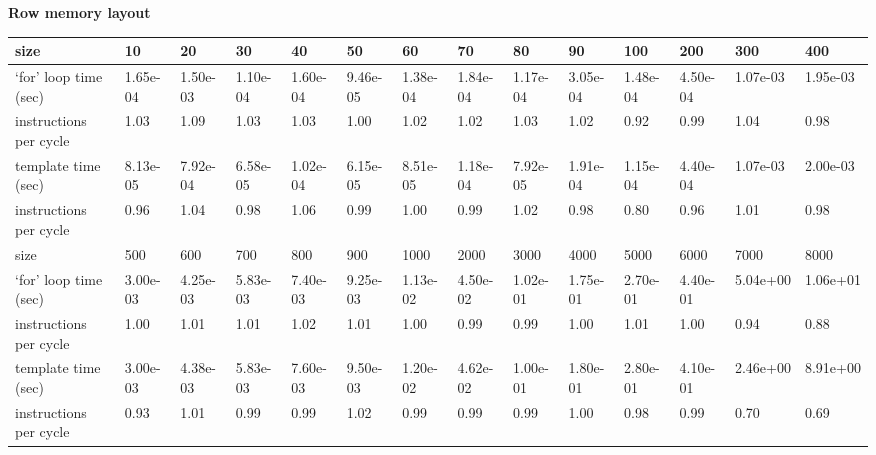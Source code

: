 \documentclass[a4paper,11pt]{article}
\begin{document}
\bf
Row memory layout\\
\rm



\begin{tabular}{|l|l|l|l|l|l|l|l|l|l|l|l|l|l|}
\hline
size & 10 & 20 & 30 & 40 & 50 & 60 & 70 & 80 & 90 & 100 & 200 & 300 & 400 \\
\hline
`for' loop time (sec) & 1.65e-04 & 1.50e-03 & 1.10e-04 & 1.60e-04 & 9.46e-05 & 1.38e-04 & 1.84e-04 & 1.17e-04 & 3.05e-04 & 1.48e-04 & 4.50e-04 & 1.07e-03 & 1.95e-03\\
instructions per cycle & 1.03 & 1.09 & 1.03 & 1.03 & 1.00 & 1.02 & 1.02 & 1.03 & 1.02 & 0.92 & 0.99 & 1.04 & 0.98 \\
\hline
template time (sec) & 8.13e-05 & 7.92e-04 & 6.58e-05 & 1.02e-04 & 6.15e-05 & 8.51e-05 & 1.18e-04 & 7.92e-05 & 1.91e-04 & 1.15e-04 & 4.40e-04 & 1.07e-03 & 2.00e-03 \\
instructions per cycle & 0.96 & 1.04 & 0.98 & 1.06 & 0.99 & 1.00 & 0.99 & 1.02 & 0.98 & 0.80 & 0.96 & 1.01 & 0.98 \\
\hline
\hline
size & 500 & 600 & 700 & 800 & 900 & 1000 & 2000 & 3000 & 4000 & 5000 & 6000 & 7000 & 8000\\
\hline
`for' loop time (sec) & 3.00e-03 & 4.25e-03 & 5.83e-03 & 7.40e-03 & 9.25e-03 & 1.13e-02 & 4.50e-02 & 1.02e-01 & 1.75e-01 & 2.70e-01 & 4.40e-01 & 5.04e+00 & 1.06e+01 \\
instructions per cycle & 1.00 & 1.01 & 1.01 & 1.02 & 1.01 & 1.00 & 0.99 & 0.99 & 1.00 & 1.01 & 1.00 & 0.94 & 0.88\\
\hline
template time (sec) & 3.00e-03 & 4.38e-03 & 5.83e-03 & 7.60e-03 & 9.50e-03 & 1.20e-02 & 4.62e-02 & 1.00e-01 & 1.80e-01 & 2.80e-01 & 4.10e-01 & 2.46e+00 & 8.91e+00\\
instructions per cycle & 0.93 & 1.01 & 0.99 & 0.99 & 1.02 & 0.99 & 0.99 & 0.99 & 1.00 & 0.98 & 0.99 & 0.70 & 0.69\\
\hline
\end{tabular}\\
\end{document}
